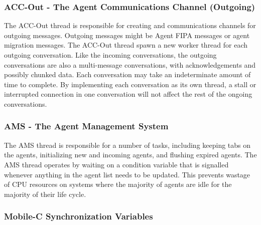       \subsubsection{ACC-Out - The Agent Communications Channel (Outgoing)}
        The ACC-Out thread is responsible for creating and communications
          channels for outgoing messages. 
        Outgoing messages might be Agent FIPA messages or agent migration
          messages.
        The ACC-Out thread spawn a new worker thread for each outgoing
          conversation.
        Like the incoming conversations, the outgoing conversations are also
          a multi-message conversations, with acknowledgements and possibly
          chunked data.
        Each conversation may take an indeterminate amount of time to complete.
        By implementing each conversation as its own thread, a stall or 
          interrupted connection in one conversation will not affect the rest
          of the ongoing conversations.

      \subsubsection{AMS - The Agent Management System}
        The AMS thread is responsible for a number of tasks, including keeping tabs
          on the agents, initializing new and incoming agents, and flushing 
          expired agents. 
        The AMS thread operates by waiting on a condition variable that is signalled
          whenever anything in the agent list needs to be updated.
        This prevents wastage of CPU resources on systems where the majority of
          agents are idle for the majority of their life cycle.

      \subsubsection{Mobile-C Synchronization Variables}
      


